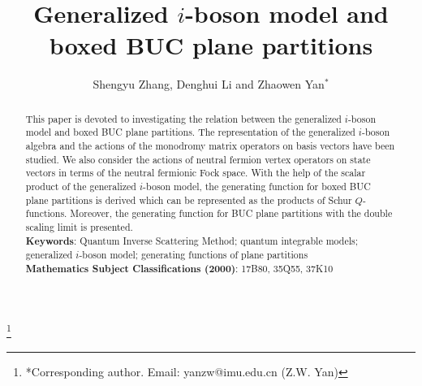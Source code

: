 \documentclass[11pt,reqno]{amsart}
\numberwithin{equation}{section}
\begin{document}
	\title{Generalized $i$-boson model and boxed BUC plane partitions}
	\author{Shengyu Zhang, Denghui Li and  Zhaowen Yan$^*$}
	
	
	\thanks{*Corresponding author. Email: yanzw@imu.edu.cn (Z.W. Yan)}
	
	\begin{abstract}
This paper is devoted to investigating the relation between the   generalized $i$-boson model and  boxed BUC plane partitions. The representation of  the generalized $i$-boson algebra and the actions of the monodromy matrix operators on  basis vectors  have  been studied. We also consider the actions of neutral fermion vertex operators on state vectors  in terms of the neutral fermionic Fock space. With the help of the scalar product of the   generalized $i$-boson model, the generating function for  boxed BUC plane partitions is derived which can  be represented as the products of Schur $Q$-functions. Moreover, the generating function for BUC plane partitions with the double scaling limit is presented. \\
\textbf{Keywords}: Quantum Inverse Scattering Method; quantum integrable models;   generalized $i$-boson  model;  generating functions of plane partitions\\
\textbf{ Mathematics Subject Classifications (2000)}: 17B80, 35Q55, 37K10
\end{abstract}
\maketitle
\tableofcontents
\end{document}
